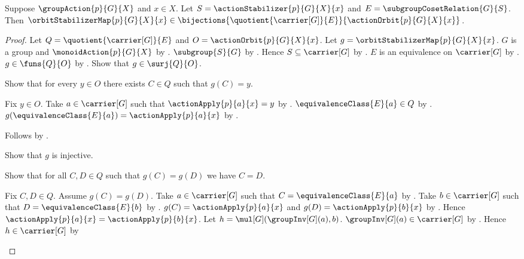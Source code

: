 \begin{theorem}\label{orbit_stabilizer_map_bijection}
    Suppose $\groupAction{p}{G}{X}$ and $x\in X$.
    Let $S=\actionStabilizer{p}{G}{X}{x}$ and
        $E=\subgroupCosetRelation{G}{S}$.
    Then $\orbitStabilizerMap{p}{G}{X}{x}\in
        \bijections{\quotient{\carrier[G]}{E}}
            {\actionOrbit{p}{G}{X}{x}}$.
\end{theorem}
\begin{proof}
    Let $Q=\quotient{\carrier[G]}{E}$ and
        $O=\actionOrbit{p}{G}{X}{x}$.
    Let $g=\orbitStabilizerMap{p}{G}{X}{x}$.
    $G$ is a group and $\monoidAction{p}{G}{X}$ by
        .
    $\subgroup{S}{G}$ by .
    Hence $S\subseteq\carrier[G]$ by .
    $E$ is an equivalence on $\carrier[G]$ by
        .
    $g\in\funs{Q}{O}$ by .
    Show that $g\in\surj{Q}{O}$.
    \begin{subproof}
        Show that for every $y\in O$ there exists $C\in Q$ such that
            $g(C)=y$.
        \begin{subproof}
            Fix $y\in O$.
            Take $a\in\carrier[G]$ such that
                $\actionApply{p}{a}{x}=y$ by .
            $\equivalenceClass{E}{a}\in Q$ by .
            $g(\equivalenceClass{E}{a})=\actionApply{p}{a}{x}$ by
                .
        \end{subproof}
        Follows by .
    \end{subproof}
    Show that $g$ is injective.
    \begin{subproof}
        Show that for all $C,D\in Q$ such that $g(C)=g(D)$
            we have $C=D$.
        \begin{subproof}
            Fix $C,D\in Q$.
            Assume $g(C)=g(D)$.
            Take $a\in\carrier[G]$ such that
                $C=\equivalenceClass{E}{a}$ by .
            Take $b\in\carrier[G]$ such that
                $D=\equivalenceClass{E}{b}$ by .
            $g(C)=\actionApply{p}{a}{x}$ and
                $g(D)=\actionApply{p}{b}{x}$ by
                .
            Hence $\actionApply{p}{a}{x}=\actionApply{p}{b}{x}$.
            Let $h=\mul[G](\groupInv[G](a),b)$.
            $\groupInv[G](a)\in\carrier[G]$ by
                .
            Hence $h\in\carrier[G]$ by

\end{subproof}
\end{subproof}
\end{proof}
